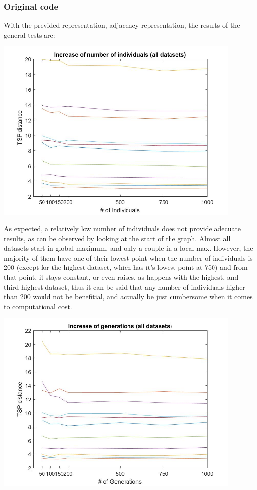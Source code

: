 \subsubsection{Original code}

With the provided representation, adjacency representation, the results of the
general tests are:

\begin{center}
\includegraphics[width=12cm]{img/xalt_edges/numberIndiv.jpg}
\end{center}

As expected, a relatively low number of individuals does not provide adecuate
results, as can be observed by looking at the start of the graph. Almost
all datasets start in global maximum, and only a couple in a local max. However,
the majority of them have one of their lowest point when the number of
individuals is 200 (except for the highest dataset, which has it's lowest
point at 750) and from that point, it stays constant, or even raises, as
happens with the highest, and third highest dataset, thus it can be said
that any number of individuals higher than 200 would not be benefitial, and
actually be just cumbersome when it comes to computational cost. 

\begin{center}
\includegraphics[width=12cm]{img/xalt_edges/numberGens.jpg}
\end{center}

